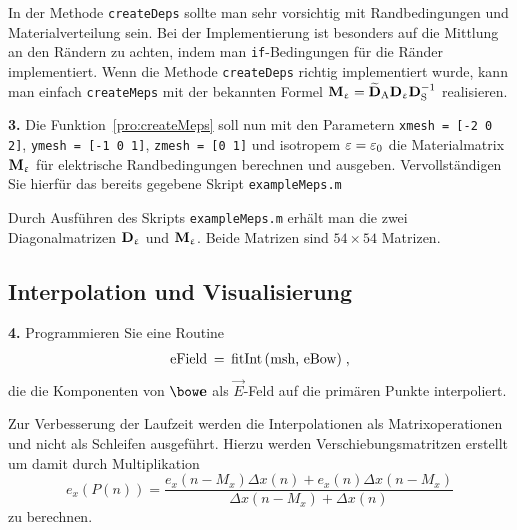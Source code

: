 \documentclass[Protokollheft.tex]{subfiles}
\begin{document}
\noindent
In der Methode \lstinline{createDeps} sollte man sehr vorsichtig mit Randbedingungen und Materialverteilung sein. Bei der Implementierung ist besonders auf die Mittlung an den Rändern zu achten, indem man \lstinline{if}-Bedingungen für die Ränder implementiert. Wenn die Methode \lstinline{createDeps} richtig implementiert wurde, kann man einfach \lstinline{createMeps} mit der bekannten Formel $\Meps=\DAd\Deps\DS^{-1}$ realisieren.
\begin{framed}
	\noindent \textbf{3.} Die Funktion~\eqref{pro:createMeps} soll nun mit den Parametern
\lstinline{xmesh = [-2 0 2]}, \lstinline{ymesh = [-1 0 1]}, \lstinline{zmesh = [0 1]} und
isotropem $\eps=\eps_0$ die Materialmatrix
$\Meps$ für elektrische Randbedingungen berechnen und ausgeben. Vervollständigen Sie hierfür das bereits gegebene Skript \lstinline{exampleMeps.m}\label{exer:MepsExample}
\end{framed}
\noindent
Durch Ausführen des Skripts \lstinline{exampleMeps.m} erhält man die zwei Diagonalmatrizen $\Deps$ und $\Meps$. Beide Matrizen sind  $54 \times 54$ Matrizen. 


\subsection{Interpolation und Visualisierung}

\begin{framed}
	\noindent \textbf{4.} Programmieren Sie eine Routine
\begin{align}
	\lstinline{eField = fitInt(msh, eBow)} \; , \label{mthd:fitInt}
\end{align}	
die die Komponenten von $\efit$ als $\vec{E}$-Feld auf die primären Punkte interpoliert.\label{exer:fitInt}
\end{framed}
\noindent
Zur Verbesserung der Laufzeit werden die Interpolationen als Matrixoperationen und nicht als Schleifen ausgeführt. Hierzu werden Verschiebungsmatritzen erstellt um damit durch Multiplikation 
\begin{equation*}
	e_x(P(n)) =\frac{e_x (n - M_x )\Delta x(n) + e_x (n)\Delta x(n - M_x)}  {\Delta x(n - M_x ) + \Delta x(n)}
\end{equation*} 
 zu berechnen.
\end{document}
